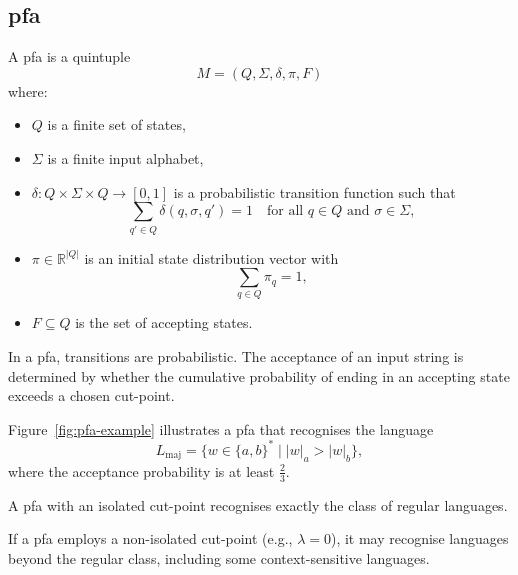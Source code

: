 
\subsection{\acrfull{pfa}}
\label{subsec:pfa}

\begin{definition}
A \gls{pfa} is a quintuple 
\[
M = (Q, \Sigma, \delta, \pi, F)
\]
where:
\begin{itemize}
    \item \( Q \) is a finite set of states,
    \item \( \Sigma \) is a finite input alphabet,
    \item \( \delta: Q \times \Sigma \times Q \rightarrow [0,1] \) is a probabilistic transition function such that 
    \[
    \sum_{q' \in Q} \delta(q, \sigma, q') = 1 \quad \text{for all } q \in Q \text{ and } \sigma \in \Sigma,
    \]
    \item \( \pi \in \mathbb{R}^{|Q|} \) is an initial state distribution vector with 
    \[
    \sum_{q \in Q} \pi_q = 1,
    \]
    \item \( F \subseteq Q \) is the set of accepting states.
\end{itemize}
\end{definition}

\begin{remark}
In a \gls{pfa}, transitions are probabilistic. The acceptance of an input string is determined by whether the cumulative probability of ending in an accepting state exceeds a chosen cut-point.
\end{remark}

\begin{example}
Figure~\ref{fig:pfa-example} illustrates a \gls{pfa} that recognises the language 
\[
L_{\text{maj}} = \{ w \in \{a,b\}^* \mid |w|_a > |w|_b \},
\]
where the acceptance probability is at least \( \frac{2}{3} \).
\end{example}

\begin{theorem}
\label{thm:rabin}
A \gls{pfa} with an isolated cut-point recognises exactly the class of regular languages.
\end{theorem}

\begin{proposition}
If a \gls{pfa} employs a non-isolated cut-point (e.g., \(\lambda = 0\)), it may recognise languages beyond the regular class, including some context-sensitive languages.
\end{proposition}

